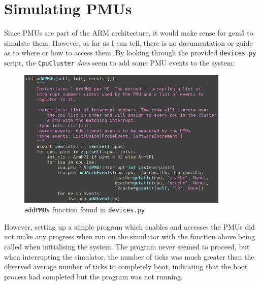 \section{Simulating PMUs}
Since PMUs are part of the ARM architecture, it would make sense for gem5 to 
simulate them. However, as far as I can tell, there is no documentation or 
guide as to where or how to access them. By looking through the provided 
\texttt{devices.py} script, the \texttt{CpuCluster} \textit{does} seem to add 
some PMU events to the system:
\begin{figure}[H]
    \centering
    \includegraphics[width=0.9\textwidth]{screenshots/sim-pmu/devices-adds-pmus.png}
    \caption{\texttt{addPMUs} function found in \texttt{devices.py}}
\end{figure}
However, setting up a simple program which enables and accesses the PMUs did not
make any progress when run on the simulator with the function above being called
when initialising the system. The program never seemed to proceed, but when 
interrupting the simulator, the number of ticks was much greater than the 
observed average number of ticks to completely boot, indicating that the boot 
process had completed but the program was not running.

